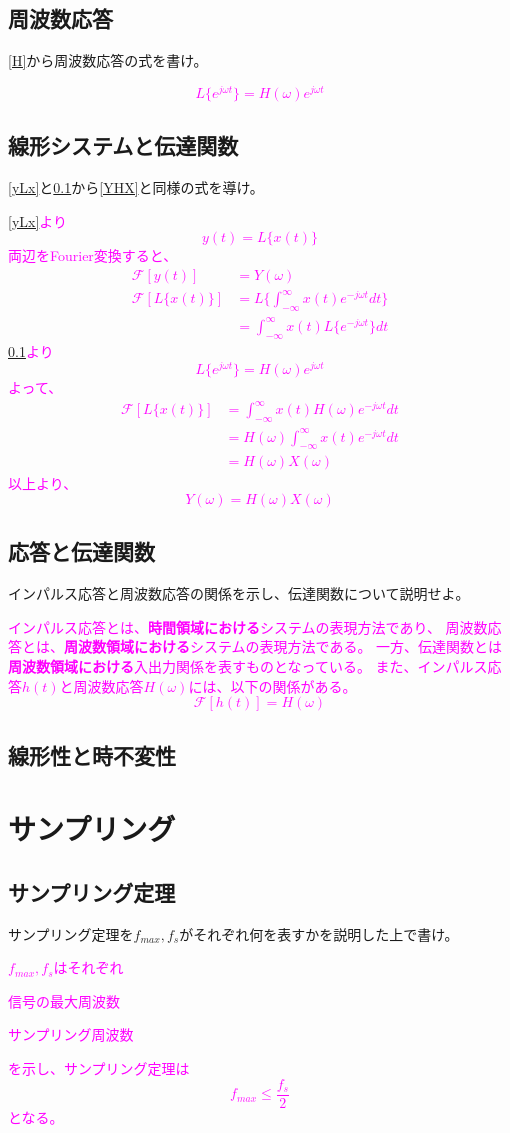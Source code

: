 \documentclass[twocolumn]{ltjsarticle}
\newcommand{\visible}{visible}
\newcommand{\ans}[1]{
\begin{tcolorbox}[\visible]
\textcolor{magenta}{#1}
\end{tcolorbox}
}
\begin{document}
\subsection{周波数応答}\label{He}
\ref{H}から周波数応答の式を書け。
\ans{
    $$L\{e^{j\omega t}\}=H(\omega)e^{j\omega t}$$
}
\subsection{線形システムと伝達関数}
\ref{yLx}と\ref{He}から\ref{YHX}と同様の式を導け。
\ans{
    \ref{yLx}より$$y(t)=L\{x(t)\}$$
    両辺をFourier変換すると、
    \begin{align*}
        \mathcal{F}[y(t)]&=Y(\omega)\\
        \mathcal{F}[L\{x(t)\}]&=L\{\int_{-\infty}^{\infty}x(t)e^{-j\omega t}dt\}\\
        &=\int_{-\infty}^{\infty}x(t)L\{e^{-j\omega t}\}dt
    \end{align*}
    \ref{He}より$$L\{e^{j\omega t}\}=H(\omega)e^{j\omega t}$$
    よって、
    \begin{align*}
        \mathcal{F}[L\{x(t)\}]&=\int_{-\infty}^{\infty}x(t)H(\omega)e^{-j\omega t}dt\\
        &=H(\omega)\int_{-\infty}^{\infty}x(t)e^{-j\omega t}dt\\
        &=H(\omega)X(\omega)
    \end{align*}
    以上より、
    $$Y(\omega)=H(\omega)X(\omega)$$
}
\subsection{応答と伝達関数}
インパルス応答と周波数応答の関係を示し、伝達関数について説明せよ。
\ans{
    インパルス応答とは、\textbf{時間領域における}システムの表現方法であり、
    周波数応答とは、\textbf{周波数領域における}システムの表現方法である。
    一方、伝達関数とは\textbf{周波数領域における}入出力関係を表すものとなっている。
    また、インパルス応答$h(t)$と周波数応答$H(\omega)$には、以下の関係がある。
    $$\mathcal{F}[h(t)]=H(\omega)$$
}
\subsection{線形性と時不変性}

\clearpage
\section{サンプリング}
\subsection{サンプリング定理}
サンプリング定理を$f_{max},f_s$がそれぞれ何を表すかを説明した上で書け。
\ans{
    $f_{max},f_s$はそれぞれ
    \begin{description}
        \centering
        \item[$f_{max}$]信号の最大周波数
        \item[$f_s$]サンプリング周波数  
    \end{description}
    を示し、サンプリング定理は
    $$f_{max}\leq\frac{f_s}{2}$$
    となる。
}
\end{document}
